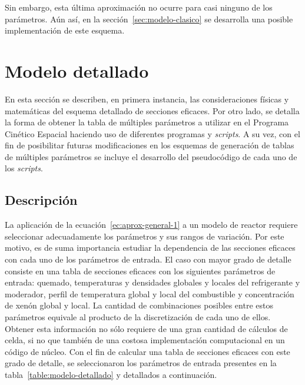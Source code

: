 \documentclass[11pt]{article}
\begin{document}
\noindent
Sin embargo, esta última aproximación no ocurre para casi ninguno de los parámetros. Aún así, en la sección~\ref{sec:modelo-clasico} se desarrolla una posible implementación de este esquema.


\section{Modelo detallado}
\label{sec:modelo-detallado}

En esta sección se describen, en primera instancia, las consideraciones físicas y matemáticas del esquema detallado de secciones eficaces. Por otro lado, se detalla la forma de obtener la tabla de múltiples parámetros a utilizar en el Programa Cinético Espacial haciendo uso de diferentes programas y \emph{scripts}. A su vez, con el fin de posibilitar futuras modificaciones en los esquemas de generación de tablas de múltiples parámetros se incluye el desarrollo del pseudocódigo de cada uno de los \emph{scripts}.


\subsection{Descripción}

La aplicación de la ecuación~\ref{ec:aprox-general-1} a un modelo de reactor requiere seleccionar adecuadamente los parámetros y sus rangos de variación. Por este motivo, es de suma importancia estudiar la dependencia de las secciones eficaces con cada uno de los parámetros de entrada. El caso con mayor grado de detalle consiste en una tabla de secciones eficaces con los siguientes parámetros de entrada: quemado, temperaturas y densidades globales y locales del refrigerante y moderador, perfil de temperatura global y local del combustible y concentración de xenón global y local. La cantidad de combinaciones posibles entre estos parámetros equivale al producto de la discretización de cada uno de ellos. Obtener esta información no sólo requiere de una gran cantidad de cálculos de celda, si no que también de una costosa implementación computacional en un código de núcleo. Con el fin de calcular una tabla de secciones eficaces con este grado de detalle, se seleccionaron los parámetros de entrada presentes en la tabla~\ref{table:modelo-detallado} y detallados a continuación.
\end{document}
